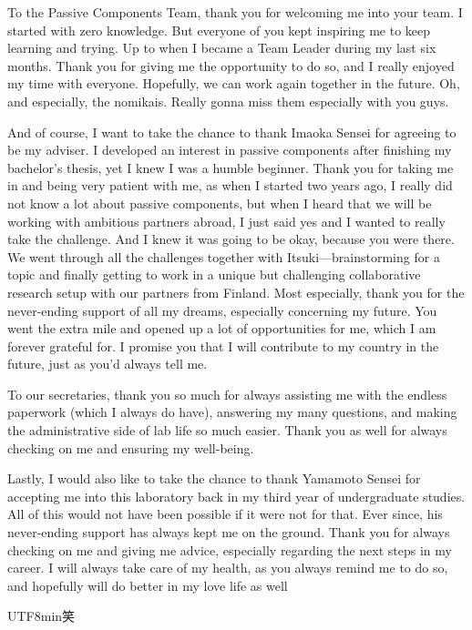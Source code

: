 \par To the Passive Components Team, thank you for welcoming me into your team. I started with zero knowledge. But everyone of you kept inspiring me to keep learning and trying. Up to when I became a Team Leader during my last six months. Thank you for giving me the opportunity to do so, and I really enjoyed my time with everyone. Hopefully, we can work again together in the future. Oh, and especially, the nomikais. Really gonna miss them especially with you guys.

\par And of course, I want to take the chance to thank Imaoka Sensei for agreeing to be my adviser. I developed an interest in passive components after finishing my bachelor's thesis, yet I knew I was a humble beginner. Thank you for taking me in and being very patient with me, as when I started two years ago, I really did not know a lot about passive components, but when I heard that we will be working with ambitious partners abroad, I just said yes and I wanted to really take the challenge. And I knew it was going to be okay, because you were there. We went through all the challenges together with Itsuki—brainstorming for a topic and finally getting to work in a unique but challenging collaborative research setup with our partners from Finland. Most especially, thank you for the never-ending support of all my dreams, especially concerning my future. You went the extra mile and opened up a lot of opportunities for me, which I am forever grateful for. I promise you that I will contribute to my country in the future, just as you'd always tell me.  

\par To our secretaries, thank you so much for always assisting me with the endless paperwork (which I always do have), answering my many questions, and making the administrative side of lab life so much easier. Thank you as well for always checking on me and ensuring my well-being.

\par Lastly, I would also like to take the chance to thank Yamamoto Sensei for accepting me into this laboratory back in my third year of undergraduate studies. All of this would not have been possible if it were not for that. Ever since, his never-ending support has always kept me on the ground. Thank you for always checking on me and giving me advice, especially regarding the next steps in my career. I will always take care of my health, as you always remind me to do so, and hopefully will do better in my love life as well \begin{CJK}{UTF8}{min}笑\end{CJK}

